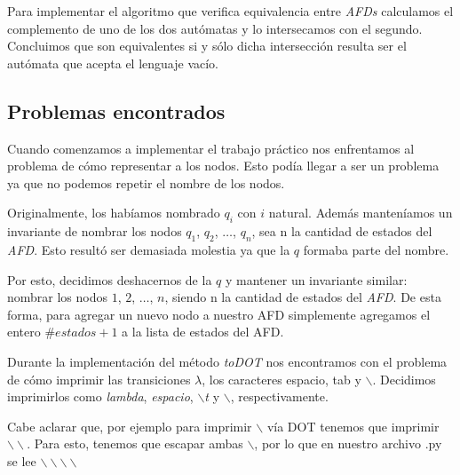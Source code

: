 Para implementar el algoritmo que verifica equivalencia entre \emph{AFDs} calculamos el complemento de uno de los dos autómatas y lo intersecamos con el segundo. Concluimos que son equivalentes si y sólo dicha intersección resulta ser el autómata que acepta el lenguaje vacío.

\subsection{Problemas encontrados}

Cuando comenzamos a implementar el trabajo práctico nos enfrentamos al problema de cómo representar a los nodos. Esto podía llegar a ser un problema ya que no podemos repetir el nombre de los nodos.

Originalmente, los habíamos nombrado \emph{$q_i$} con $i$ natural. Además manteníamos un invariante de nombrar los nodos $q_1$, $q_2$, $\hdots$, $q_n$, sea n la cantidad de estados del \emph{AFD}. Esto resultó ser demasiada molestia ya que la $q$ formaba parte del nombre.

Por esto, decidimos deshacernos de la $q$ y mantener un invariante similar: nombrar los nodos $1$, $2$, $\hdots$, $n$, siendo n la cantidad de estados del \emph{AFD}. De esta forma, para agregar un nuevo nodo a nuestro AFD simplemente agregamos el entero $\#estados + 1$ a la lista de estados del AFD.


Durante la implementación del método \emph{toDOT} nos encontramos con el problema de cómo imprimir las transiciones $\lambda$, los caracteres espacio, tab y $\backslash$. Decidimos imprimirlos como \emph{lambda}, \emph{espacio},  \emph{$\backslash$t} y $\backslash$, respectivamente.

Cabe aclarar que, por ejemplo para imprimir $\backslash$ vía DOT tenemos que imprimir $\backslash\backslash$. Para esto, tenemos que escapar ambas $\backslash$, por lo que en nuestro archivo .py se lee $\backslash\backslash\backslash\backslash$